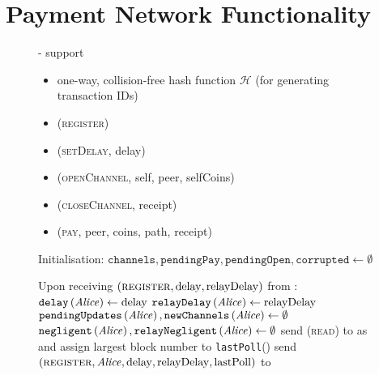 \section{Payment Network Functionality}
  \begin{figure}[H]
    \begin{systembox}{\fpaynet - support}
        \begin{itemize}
          \item one-way, collision-free hash function $\mathcal{H}$ (for
          generating transaction IDs)
        \end{itemize}

        \begin{itemize}
          \item (\textsc{register})
          \item (\textsc{setDelay}, delay)
          \item (\textsc{openChannel}, self, peer, selfCoins)
          \item (\textsc{closeChannel}, receipt)
          \item (\textsc{pay}, peer, coins, path, receipt)
        \end{itemize}

      \begin{algorithmic}[1]
        \State Initialisation:
        \Indent
          \State $\mathtt{channels}, \mathtt{pendingPay}, \mathtt{pendingOpen},
          \mathtt{corrupted} \gets \emptyset$
        \EndIndent
        \State

        \State Upon receiving $\left(\textsc{register}, \mathrm{delay},
        \mathrm{relayDelay}\right)$ from \alice:
        \Indent
          \State $\mathtt{delay}\left(\mathit{Alice}\right) \gets \mathrm{delay}$
          \State $\mathtt{relayDelay}\left(\mathit{Alice}\right) \gets
          \mathrm{relayDelay}$
          \State $\mathtt{pendingUpdates}\left(\mathit{Alice}\right),
          \mathtt{newChannels}\left(\mathit{Alice}\right) \gets \emptyset$
          \State $\mathtt{negligent}\left(\mathit{Alice}\right),
          \mathtt{relayNegligent}\left(\mathit{Alice}\right) \gets \emptyset$
          \State send (\textsc{read}) to \ledger{} as \alice{} and assign
          largest block number to \texttt{lastPoll}(\alice)
          \label{alg:fpaynet:support:lastpoll}
          \State send $\left(\textsc{register}, \mathit{Alice}, \mathrm{delay},
          \mathrm{relayDelay}, \mathrm{lastPoll}\right)$ to \simulator
        \EndIndent
        \State


\end{algorithmic}
\end{systembox}
\end{figure}

